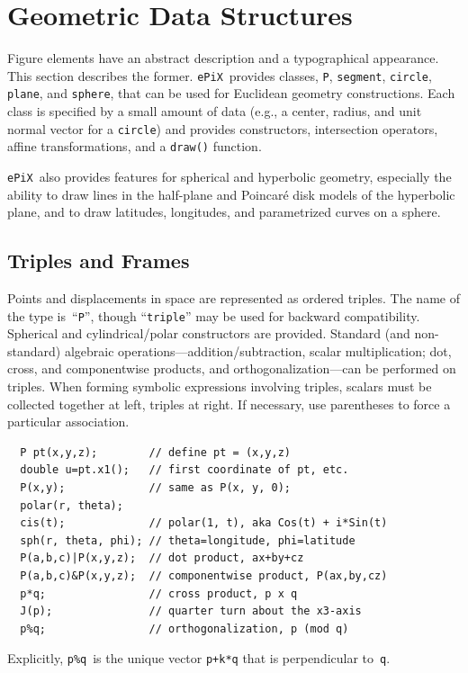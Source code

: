 \documentclass[12pt]{report}
\newcommand{\code}[1]{\texttt{#1}}
\newcommand{\ePiX}{\code{ePiX}}
\begin{document}
\section{Geometric Data Structures}

Figure elements have an abstract description and a typographical
appearance. This section describes the former.  \ePiX\ provides
classes, \code{P}, \code{segment}, \code{circle}, \code{plane}, and
\code{sphere}, that can be used for Euclidean geometry constructions.
Each class is specified by a small amount of data (e.g., a center,
radius, and unit normal vector for a \code{circle}) and provides
constructors, intersection operators, affine transformations, and a
\code{draw()} function.

\ePiX\ also provides features for spherical and hyperbolic geometry,
especially the ability to draw lines in the half-plane and Poincar\'e
disk models of the hyperbolic plane, and to draw latitudes,
longitudes, and parametrized curves on a sphere.


\subsection*{Triples and Frames}

Points and displacements in space are represented as ordered triples.
The name of the type is~``\code{P}'', though ``\code{triple}'' may
be used for backward compatibility. Spherical and cylindrical/polar
constructors are provided. Standard (and non-standard) algebraic
operations---addition/subtraction, scalar multiplication; dot, cross,
and componentwise products, and orthogonalization---can be performed
on triples.  When forming symbolic expressions involving triples,
scalars must be collected together at left, triples at right. If
necessary, use parentheses to force a particular association.
\begin{verbatim}
  P pt(x,y,z);        // define pt = (x,y,z)
  double u=pt.x1();   // first coordinate of pt, etc.
  P(x,y);             // same as P(x, y, 0);
  polar(r, theta);
  cis(t);             // polar(1, t), aka Cos(t) + i*Sin(t)
  sph(r, theta, phi); // theta=longitude, phi=latitude
  P(a,b,c)|P(x,y,z);  // dot product, ax+by+cz
  P(a,b,c)&P(x,y,z);  // componentwise product, P(ax,by,cz)
  p*q;                // cross product, p x q
  J(p);               // quarter turn about the x3-axis
  p%q;                // orthogonalization, p (mod q)
\end{verbatim}
Explicitly, \code{p\%q}~is the unique vector \code{p+k*q} that is
perpendicular to~\code{q}.
\end{document}
